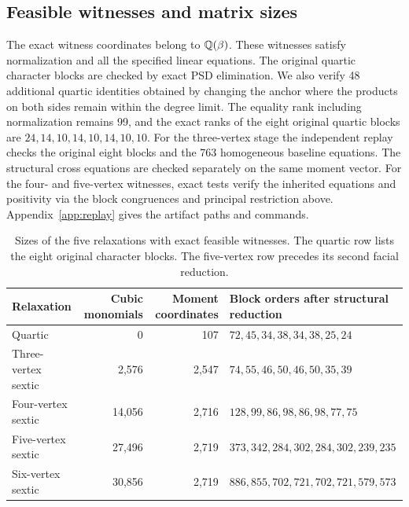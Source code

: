 \subsection{Feasible witnesses and matrix sizes}

The exact witness coordinates belong to $\mathbb Q(\beta)$. These witnesses satisfy normalization and all the specified linear equations. The original quartic character blocks are checked by exact PSD elimination. We also verify 48 additional quartic identities obtained by changing the anchor where the products on both sides remain within the degree limit. The equality rank including normalization remains 99, and the exact ranks of the eight original quartic blocks are $24,14,10,14,10,14,10,10$. For the three-vertex stage the independent replay checks the original eight blocks and the 763 homogeneous baseline equations. The structural cross equations are checked separately on the same moment vector. For the four- and five-vertex witnesses, exact tests verify the inherited equations and positivity via the block congruences and principal restriction above. Appendix~\ref{app:replay} gives the artifact paths and commands.

\begin{table}[tb]
\centering
\small
\begin{tabular}{@{}lrrl@{}}
\toprule
Relaxation & Cubic monomials & Moment coordinates & Block orders after structural reduction\\
\midrule
Quartic & 0 & 107 & $72,45,34,38,34,38,25,24$\\
Three-vertex sextic & 2{,}576 & 2{,}547 & $74,55,46,50,46,50,35,39$\\
Four-vertex sextic & 14{,}056 & 2{,}716 & $128,99,86,98,86,98,77,75$\\
Five-vertex sextic & 27{,}496 & 2{,}719 & $373,342,284,302,284,302,239,235$\\
Six-vertex sextic & 30{,}856 & 2{,}719 & $886,855,702,721,702,721,579,573$\\
\bottomrule
\end{tabular}
\caption{Sizes of the five relaxations with exact feasible witnesses. The quartic row lists the eight original character blocks. The five-vertex row precedes its second facial reduction.}\label{tab:sizes}
\end{table}

